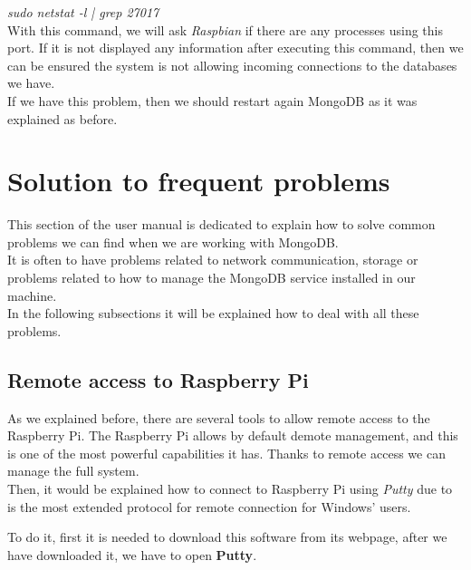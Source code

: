 \textit{sudo netstat -l | grep 27017}\\

With this command, we will ask \textit{Raspbian} if there are any processes using this port. If it is not displayed any information after executing this command, then we can be ensured the system is not allowing incoming connections to the databases we have.\\

If we have this problem, then we should restart again MongoDB as it was explained as before.

\section{Solution to frequent problems}

This section of the user manual is dedicated to explain how to solve common problems we can find when we are working with MongoDB.\\

It is often to have problems related to network communication, storage or problems related to how to manage the MongoDB service installed in our machine.\\

In the following subsections it will be explained how to deal with all these problems.

\subsection{Remote access to Raspberry Pi}

As we explained before, there are several tools to allow remote access to the Raspberry Pi. The Raspberry Pi allows by default demote management, and this is one of the most powerful capabilities it has. Thanks to remote access we can manage the full system.\\

Then, it would be explained how to connect to Raspberry Pi using \textit{Putty} due to is the most extended protocol for remote connection for Windows' users.

To do it, first it is needed to download this software from its webpage, after we have downloaded it, we have to open \textbf{Putty}.\\

